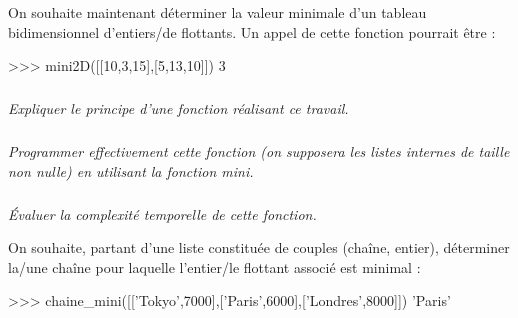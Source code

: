 \documentclass[10pt]{article}
\newif\ifprof
\begin{document}
On souhaite maintenant déterminer la valeur minimale d’un tableau bidimensionnel d’entiers/de flottants. Un appel de cette fonction pourrait être :

\begin{py}
\begin{python}
>>> mini2D([[10,3,15],[5,13,10]])
            3
\end{python}
\end{py}

\subparagraph{}
\textit{Expliquer le principe d’une fonction réalisant ce travail.}
\ifprof
\begin{corrige}
Pour rechercher un minimum dans une liste de liste, il faut rechercher le minimum dans chacune des sous-listes. Pour cela, il faut donc avoir recours à deux boucles imbriquées.
\end{corrige}
\else
\fi


\subparagraph{}
\textit{Programmer effectivement cette fonction (on supposera les listes internes de taille non nulle) en utilisant la fonction \textsf{mini}.}
\ifprof
\begin{corrige}
\begin{py}
\begin{python}
def mini2D(t):
    if len(t)==0:
        return None
    p = t[0][0]
    for i in range(len(t)):
        m = mini(t[i])
        if m<p:
            p=m
    return p
\end{python}
\end{py}
\end{corrige}
\else
\fi


\subparagraph{}
\textit{Évaluer la complexité temporelle de cette fonction.}
\ifprof
\begin{corrige}
Pour une liste de taille \textsf{nxn} il faut rechercher la valeur minimale en utilisant la fonction \textsf{mini} dans \textsf{n} listes. La complexité est donc  quadratique et donc $C(n)=\mathcal{O}(n^2)$.

\end{corrige}
\else
\fi

On souhaite, partant d’une liste constituée de couples
(chaîne, entier), déterminer la/une chaîne pour
laquelle l’entier/le flottant associé est minimal :

\begin{py}
\begin{python}
>>> chaine_mini([['Tokyo',7000],['Paris',6000],['Londres',8000]])
            'Paris'
\end{python}
\end{py}
\end{document}
